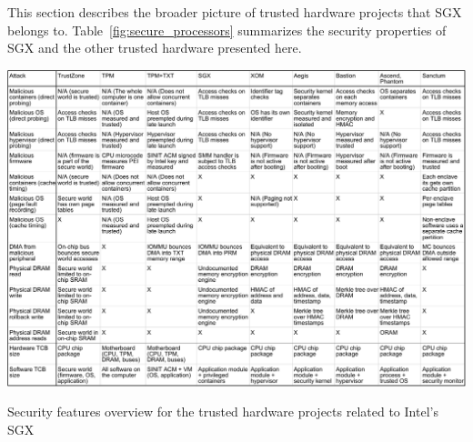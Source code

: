 \label{sec:related}

This section describes the broader picture of trusted hardware projects that
SGX belongs to. Table~\ref{fig:secure_processors} summarizes the security
properties of SGX and the other trusted hardware presented here.

\begin{table}
  \centering
  \includegraphics[angle=90,width=170mm]{figures/secure_processors_table.pdf}
  \caption{
    Security features overview for the trusted hardware projects related to
    Intel's SGX
  }
  \label{fig:secure_processors}
\end{table}












